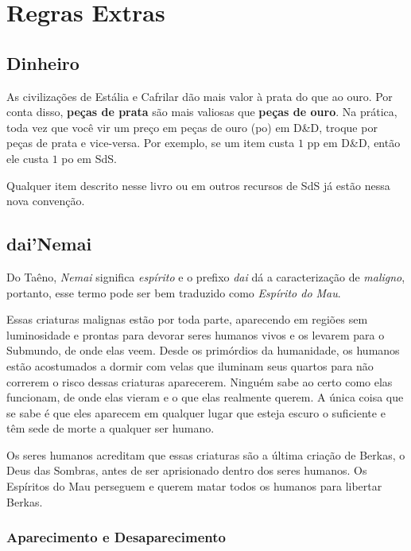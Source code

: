 \chapter{Regras Extras}%
\label{cha:regras_extras}
\begin{multicols}{2}

\section{Dinheiro}%
\label{sec:dinheiro}

As civilizações de Estália e Cafrilar dão mais valor à prata do que ao ouro. Por
conta disso, \textbf{peças de prata} são mais valiosas que \textbf{peças de
ouro}. Na prática, toda vez que você vir um preço em peças de ouro (po) em D\&D,
troque por peças de prata e vice-versa. Por exemplo, se um item custa $1$ pp em
D\&D, então ele custa $1$ po em SdS.

Qualquer item descrito nesse livro ou em outros recursos de SdS já estão nessa
nova convenção.

\section{dai'Nemai}%
\label{sec:dai'Nemai}

Do Taêno, \textit{Nemai} significa \textit{espírito} e o prefixo \textit{dai}
dá a caracterização de \textit{maligno}, portanto, esse termo pode ser bem
traduzido como \textit{Espírito do Mau}.

Essas criaturas malignas estão por toda parte, aparecendo em regiões sem
luminosidade e prontas para devorar seres humanos vivos e os levarem para o
Submundo, de onde elas veem. Desde os primórdios da humanidade, os humanos estão
acostumados a dormir com velas que iluminam seus quartos para não correrem o
risco dessas criaturas aparecerem. Ninguém sabe ao certo como elas funcionam, de
onde elas vieram e o que elas realmente querem. A única coisa que se sabe é que
eles aparecem em qualquer lugar que esteja escuro o suficiente e têm sede de
morte a qualquer ser humano.

Os seres humanos acreditam que essas criaturas são a última criação de Berkas, o
Deus das Sombras, antes de ser aprisionado dentro dos seres humanos. Os
Espíritos do Mau perseguem e querem matar todos os humanos para libertar Berkas.

\subsection{Aparecimento e Desaparecimento}%
\label{sub:aparecimento_e_desaparecimento}


\end{multicols}
